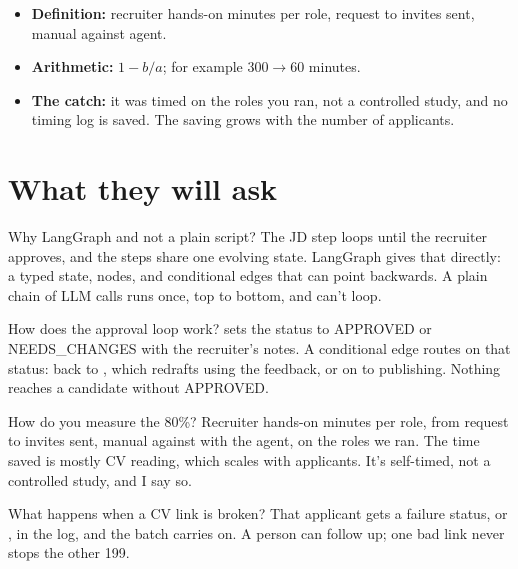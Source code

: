 \begin{measured}
\begin{itemize}
  \item \textbf{Definition:} recruiter hands-on minutes per role, request to invites sent, manual against agent.
  \item \textbf{Arithmetic:} $1 - b/a$; for example $300 \to 60$ minutes.
  \item \textbf{The catch:} it was timed on the roles you ran, not a controlled study, and no timing log is saved. The saving grows with the number of applicants.
\end{itemize}
\end{measured}

\section{What they will ask}

\begin{iq}[\core]{Why LangGraph and not a plain script?}
The JD step loops until the recruiter approves, and the steps share one evolving state. LangGraph gives that directly: a typed state, nodes, and conditional edges that can point backwards. A plain chain of LLM calls runs once, top to bottom, and can't loop.
\end{iq}

\begin{iq}[\core]{How does the approval loop work?}
 sets the status to APPROVED or NEEDS\_CHANGES with the recruiter's notes. A conditional edge routes on that status: back to , which redrafts using the feedback, or on to publishing. Nothing reaches a candidate without APPROVED.
\end{iq}

\begin{iq}[\core]{How do you measure the 80\%?}
Recruiter hands-on minutes per role, from request to invites sent, manual against with the agent, on the roles we ran. The time saved is mostly CV reading, which scales with applicants. It's self-timed, not a controlled study, and I say so.
\end{iq}

\begin{iq}{What happens when a CV link is broken?}
That applicant gets a failure status,  or , in the log, and the batch carries on. A person can follow up; one bad link never stops the other 199.
\end{iq}

